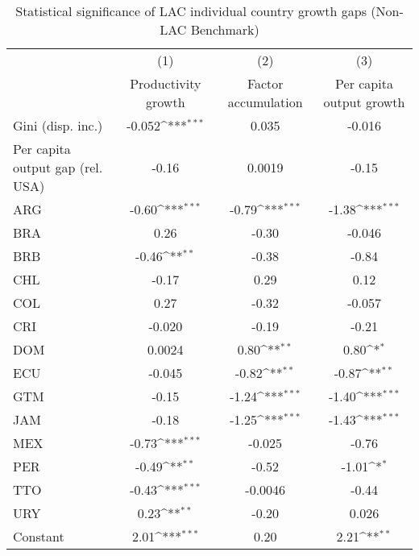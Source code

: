 \begin{sidewaystable}[htbp]\centering
\def\sym#1{\ifmmode^{#1}\else\(^{#1}\)\fi}
\caption{Statistical significance of LAC individual country growth gaps (Non-LAC Benchmark)}
\begin{tabular}{l*{3}{c}}
\toprule
                &\multicolumn{1}{c}{(1)}&\multicolumn{1}{c}{(2)}&\multicolumn{1}{c}{(3)}\\
                &\multicolumn{1}{c}{Productivity growth}&\multicolumn{1}{c}{Factor accumulation}&\multicolumn{1}{c}{Per capita output growth}\\
\midrule
Gini (disp. inc.)&   -0.052\sym{***}&    0.035         &   -0.016         \\
Per capita output gap (rel. USA)&    -0.16         &   0.0019         &    -0.15         \\
ARG             &    -0.60\sym{***}&    -0.79\sym{***}&    -1.38\sym{***}\\
BRA             &     0.26         &    -0.30         &   -0.046         \\
BRB             &    -0.46\sym{**} &    -0.38         &    -0.84         \\
CHL             &    -0.17         &     0.29         &     0.12         \\
COL             &     0.27         &    -0.32         &   -0.057         \\
CRI             &   -0.020         &    -0.19         &    -0.21         \\
DOM             &   0.0024         &     0.80\sym{**} &     0.80\sym{*}  \\
ECU             &   -0.045         &    -0.82\sym{**} &    -0.87\sym{**} \\
GTM             &    -0.15         &    -1.24\sym{***}&    -1.40\sym{***}\\
JAM             &    -0.18         &    -1.25\sym{***}&    -1.43\sym{***}\\
MEX             &    -0.73\sym{***}&   -0.025         &    -0.76         \\
PER             &    -0.49\sym{**} &    -0.52         &    -1.01\sym{*}  \\
TTO             &    -0.43\sym{***}&  -0.0046         &    -0.44         \\
URY             &     0.23\sym{**} &    -0.20         &    0.026         \\
Constant        &     2.01\sym{***}&     0.20         &     2.21\sym{**} \\

\end{tabular}
\end{sidewaystable}
